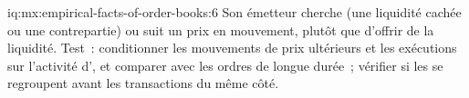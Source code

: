 \begin{solution}{iq:mx:empirical-facts-of-order-books:6}
Son émetteur cherche (une liquidité cachée ou une contrepartie) ou suit un prix en mouvement, plutôt que d'offrir de la liquidité. Test~: conditionner les mouvements de prix
ultérieurs et les exécutions sur l'activité d', et comparer avec les ordres de longue durée~; vérifier si les  se regroupent avant les transactions du même côté.
\end{solution}
